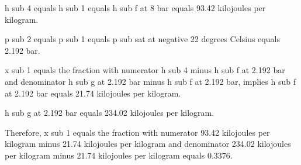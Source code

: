 h sub 4 equals h sub 1 equals h sub f at 8 bar equals 93.42 kilojoules per kilogram.

p sub 2 equals p sub 1 equals p sub sat at negative 22 degrees Celsius equals 2.192 bar.

x sub 1 equals the fraction with numerator h sub 4 minus h sub f at 2.192 bar and denominator h sub g at 2.192 bar minus h sub f at 2.192 bar, implies h sub f at 2.192 bar equals 21.74 kilojoules per kilogram.

h sub g at 2.192 bar equals 234.02 kilojoules per kilogram.

Therefore, x sub 1 equals the fraction with numerator 93.42 kilojoules per kilogram minus 21.74 kilojoules per kilogram and denominator 234.02 kilojoules per kilogram minus 21.74 kilojoules per kilogram equals 0.3376.
